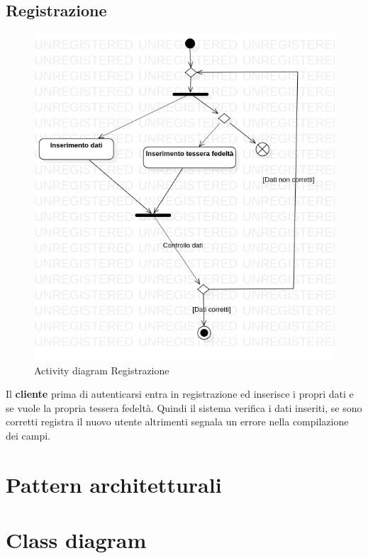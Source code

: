 \documentclass[12pt, a4paper]{article}
\numberwithin{equation}{section} %
\begin{document}
\subsection{Registrazione}
\begin{figure}[h]
\centering
\includegraphics[width=\textwidth]{Use Case Model!Registrazione!ActivityRegistrazione!ActivityDiagramRegistrazione_2.png}
\caption{Activity diagram Registrazione}
\end{figure}

Il \textbf{cliente} prima di autenticarsi entra in registrazione ed inserisce i propri dati e se vuole la propria tessera fedeltà. 
Quindi il sistema verifica i dati inseriti, se sono corretti registra il nuovo utente altrimenti segnala un errore nella compilazione dei campi.

\section{Pattern architetturali}


\section{Class diagram}
\end{document}
